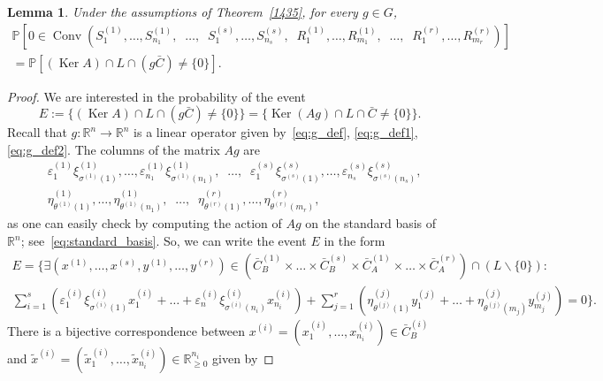 \documentclass[12pt, reqno]{amsart}
\theoremstyle{plain}
\newtheorem{lemma}[theorem]{Lemma}
\theoremstyle{definition}
\theoremstyle{remark}
\begin{document}
\begin{lemma}\label{1436}
Under the assumptions of Theorem~\ref{1435}, for every $g \in G$,
\begin{multline*}
{\mathbb{P}}[0\in {\mathop{\mathrm{Conv}}\nolimits} (S_1^{(1)}, \ldots, S_{n_1}^{(1)},\;\; \ldots,\;\; S_1^{(s)}, \ldots, S_{n_s}^{(s)},\;\;
R_1^{(1)}, \ldots, R_{m_1}^{(1)},\;\;\ldots,\;\; R_1^{(r)}, \ldots, R_{m_r}^{(r)})]
\\={\mathbb{P}}[(\operatorname*{Ker} A) \cap  L\cap (g\bar C) \neq \{0\}].
\end{multline*}
\end{lemma}
\begin{proof}
We are interested in the probability of the event
$$
E := \{(\operatorname*{Ker} A) \cap L \cap  (g\bar C) \neq \{0\}\}= \{ \operatorname*{Ker} (Ag) \cap L \cap \bar C \neq \{0\}\}.
$$
Recall that $g:{\mathbb{R}}^n\to{\mathbb{R}}^n$ is a linear operator given by~\eqref{eq:g_def}, \eqref{eq:g_def1}, \eqref{eq:g_def2}. The columns of the matrix $Ag$ are
\begin{align*}
&{\varepsilon}_1^{(1)} \xi_{\sigma^{(1)}(1)}^{(1)},  \ldots, {\varepsilon}_{n_1}^{(1)} \xi_{\sigma^{(1)}(n_1)}^{(1)},
\;\;\ldots, \;\;
{\varepsilon}_{1}^{(s)}\xi_{\sigma^{(s)}(1)}^{(s)}, \ldots, {\varepsilon}_{n_s}^{(s)}\xi_{\sigma^{(s)}(n_s)}^{(s)},\\
& \eta_{\theta^{(1)}(1)}^{(1)}, \ldots, \eta_{\theta^{(1)}(n_1)}^{(1)},
\;\;\ldots,\;\; \eta_{\theta^{(r)}(1)}^{(r)}, \ldots, \eta_{\theta^{(r)}(m_r)}^{(r)},
\end{align*}
as one can easily check by computing the action of $A g$ on the standard basis of ${\mathbb{R}}^n$; see~\eqref{eq:standard_basis}. So, we can write the event $E$ in the form
\begin{multline}\label{eq:E_product}
E = \Big\{\exists (x^{(1)},\ldots, x^{(s)},y^{(1)},\ldots, y^{(r)}) \in (\bar C_B^{(1)}\times \ldots \times \bar C_B^{(s)}\times \bar C_A^{(1)}\times \ldots \times \bar C_A^{(r)})\cap (L {\backslash}\{0\})
\colon\\
\sum_{i=1}^{s} \left({\varepsilon}_1^{(i)} \xi^{(i)}_{\sigma^{(i)}(1)} x_1^{(i)} + \ldots + {\varepsilon}_n^{(i)} \xi^{(i)}_{\sigma^{(i)}(n_i)} x_{n_i}^{(i)}\right)
+\sum_{j=1}^{r} \left( \eta^{(j)}_{\theta^{(j)}(1)} y_1^{(j)} + \ldots + \eta^{(j)}_{\theta^{(j)}(m_j)} y_{m_j}^{(j)}\right)= 0\Big\}.
\end{multline}
There is a bijective correspondence between $x^{(i)}= (x_1^{(i)},\ldots,x_{n_i}^{(i)})\in \bar C_B^{(i)}$ and $\tilde{x}^{(i)} = (\tilde{x}_1^{(i)},\ldots,\tilde{x}_{n_i}^{(i)})\in {\mathbb{R}}_{\geq 0}^{n_i}$ given by

\end{proof}
\end{document}
